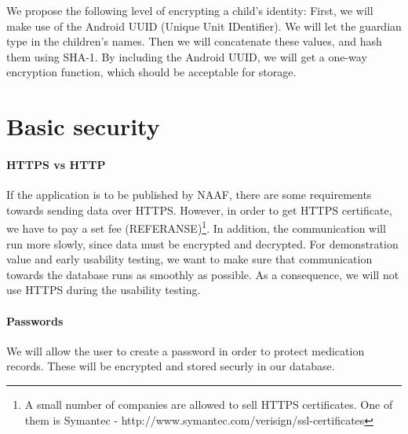 We propose the following level of encrypting a child's identity:
First, we will make use of the Android UUID (Unique Unit IDentifier). We will let the guardian type in the children's names. Then we will concatenate these values, and hash them using SHA-1\cite{sha1}. By including the Android UUID, we will get a one-way encryption function, which should be acceptable for storage.
 


\section{Basic security}
\paragraph{HTTPS vs HTTP} If the application is to be published by NAAF, there are some requirements towards sending data over HTTPS. However, in order to get HTTPS certificate, we have to pay a set fee (REFERANSE)\footnote{A small number of companies are allowed to sell HTTPS certificates. One of them is Symantec - http://www.symantec.com/verisign/ssl-certificates}. In addition, the communication will run more slowly, since data must be encrypted and decrypted. For demonstration value and early usability testing, we want to make sure that communication towards the database runs as smoothly as possible. As a consequence, we will not use HTTPS during the usability testing.


\paragraph{Passwords}
We will allow the user to create a password in order to protect medication records. These will be encrypted and stored securly in our database. 
